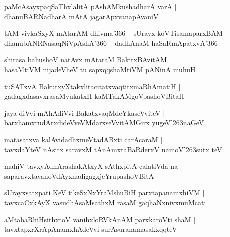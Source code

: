 \documentclass[twoside,12pt,openright]{book}
\def\S{\char'263}
\newcounter{shloka}[chapter]
\begin{document}
\begin{shloka}%
paMcAsayxpaqSaThxlalitA pAshAMkushadharA varA |\\
dhanuBARNadharA mAtA jagarApxvanapAvaniV 
\end{shloka}

\begin{shloka}%
tAM vivkaSxyX mAtarAM dhivma\char'366 ~ sUrayx koVTisamaparxBAM |\\
dhanubANRNasaqNiVpAshA\char'366 ~ dadhAnaM haSaRmApatxvA\char'366 
\end{shloka}

\begin{shloka}%
shirasa bahushoV natAvx mAtaraM BakitxBAvitAM |\\
hasaMtiVM nijadeVheV tu sapxqqshaMtiVM pANinA muhuH 
\end{shloka}

\begin{shloka}%
tuSATxvA BakutxyXtakxlitacitatxvaqtitxmaRhAmatiH |\\
gadagxdasavxrasaMyukatxH kaMTakAMgoVpashoVBitaH 
\end{shloka}

\begin{shloka}%
jaya diVvi mAhAdiVvi BakatxvaqMdeYkaseVviteV |\\
barxhamxrudArxdideVveVMdarxseVvitAMGirx yugeV\S naGeV 
\end{shloka}

\begin{shloka}%
matasatxva kalAvidadhxmeVtadABxti carAcaraM |\\
tavxdaYteV nAsitx saravxM tAnAmxtaBaRderxV namoV\S sutx teV 
\end{shloka}

\begin{shloka}%
mahiV tavxyAdhArashakAtxyX sAthxpitA calatiVda na |\\
saparavxtavanoVdAyxnadigagxjeYrupashoVBitA 
\end{shloka}

\begin{shloka}%
sUrayxsatxpati KeV tikeSxNxYraMshuBiH parxtapanamxhiVM |\\
tavxcaCxkAyX vasudhAsaMsathxM rasaM gaqhaNxnivxmuMcati
\end{shloka}

\begin{shloka}%
aMtabaRhiHsithxtoV vanihxloRVkAnAM parxkaroVti shaM |\\
tavxtapxrXrApAnamxhAdeVvi surAsuranamasakxqqteV 
\end{shloka}
\end{document}
